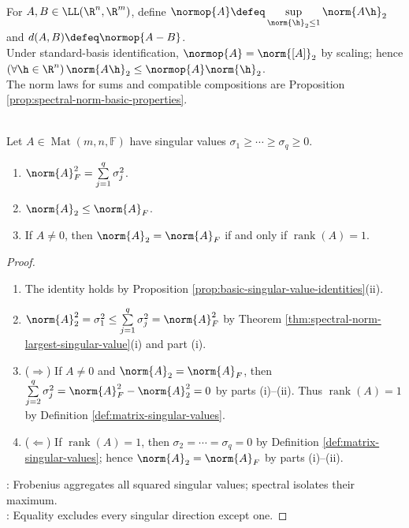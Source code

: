\begin{definition} \label{def:operator-norm-rn-rm} \\
For $A,B\in\LL(\R^n,\R^m)$, define $\normop{A}\defeq\sup\limits_{\norm{\h}_2\leq1}\norm{A\h}_2$ and $d(A,B)\defeq\normop{A-B}$.\\
Under standard-basis identification, $\normop{A}=\norm{[A]}_2$ by scaling; hence $(\forall\h\in\R^n)\,\norm{A\h}_2\leq\normop{A}\norm{\h}_2$.\\
The norm laws for sums and compatible compositions are Proposition \ref{prop:spectral-norm-basic-properties}.
\end{definition}

\begin{proposition} \label{prop:frobenius-and-spectral-norm-comparison} \\
Let $A\in\operatorname{Mat}(m,n,\mathbb{F})$ have singular values $\sigma_1\geq\cdots\geq\sigma_q\geq0$.
\begin{enumerate}[label=(\roman*)]
\setlength{\itemsep}{0pt}
\item $\norm{A}_F^2=\sum\limits_{j=1}^{q}\sigma_j^2$.
\item $\norm{A}_2\leq\norm{A}_F$.
\item If $A\neq0$, then $\norm{A}_2=\norm{A}_F$ if and only if $\operatorname{rank}(A)=1$.
\end{enumerate}
\begin{proof}
\begin{enumerate}[label=(\roman*)]
\setlength{\itemsep}{0pt}
\item[$(i)$] The identity holds by Proposition \ref{prop:basic-singular-value-identities}(ii).
\item[$(ii)$] $\norm{A}_2^2=\sigma_1^2\leq\sum\limits_{j=1}^{q}\sigma_j^2=\norm{A}_F^2$ by Theorem \ref{thm:spectral-norm-largest-singular-value}(i) and part (i).
\item[$(iii)$] ($\Rightarrow$) If $A\neq0$ and $\norm{A}_2=\norm{A}_F$, then $\sum\limits_{j=2}^{q}\sigma_j^2=\norm{A}_F^2-\norm{A}_2^2=0$ by parts (i)--(ii). Thus $\operatorname{rank}(A)=1$ by Definition \ref{def:matrix-singular-values}.
\item[$(iii)$] ($\Leftarrow$) If $\operatorname{rank}(A)=1$, then $\sigma_2=\cdots=\sigma_q=0$ by Definition \ref{def:matrix-singular-values}; hence $\norm{A}_2=\norm{A}_F$ by parts (i)--(ii).
\end{enumerate}
: Frobenius aggregates all squared singular values; spectral isolates their maximum.\\
: Equality excludes every singular direction except one.
\end{proof}
\end{proposition}

